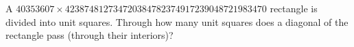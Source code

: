 A $40353607\times423874812734720384782374917239048721983470$ rectangle is divided into unit squares. Through how many unit squares does a diagonal of the rectangle pass (through their interiors)?
